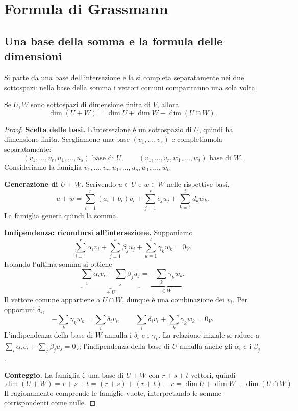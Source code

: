 
\section{Formula di Grassmann}

\subsection{Una base della somma e la formula delle dimensioni}

Si parte da una base dell'intersezione e la si completa separatamente nei due sottospazi: nella base della somma i vettori comuni compariranno una sola volta.

\begin{teorema}
Se $U,W$ sono sottospazi di dimensione finita di $V$, allora
\[
  \dim(U+W)=\dim U+\dim W-\dim(U\cap W).
\]
\end{teorema}
\begin{proof}
\textbf{Scelta delle basi.} L'intersezione è un sottospazio di $U$, quindi ha dimensione finita. Scegliamone una base $(v_1,\ldots,v_r)$ e completiamola separatamente:
\[
  (v_1,\ldots,v_r,u_1,\ldots,u_s)\text{ base di }U,
  \qquad (v_1,\ldots,v_r,w_1,\ldots,w_t)\text{ base di }W.
\]
Consideriamo la famiglia $v_1,\ldots,v_r,u_1,\ldots,u_s,w_1,\ldots,w_t$.

\textbf{Generazione di $U+W$.} Scrivendo $u\in U$ e $w\in W$ nelle rispettive basi,
\[
  u+w=\sum_{i=1}^r(a_i+b_i)v_i+\sum_{j=1}^s c_ju_j+\sum_{k=1}^t d_kw_k.
\]
La famiglia genera quindi la somma.

\textbf{Indipendenza: ricondursi all'intersezione.} Supponiamo
\[
  \sum_{i=1}^r\alpha_i v_i+\sum_{j=1}^s\beta_j u_j+\sum_{k=1}^t\gamma_k w_k=0_V.
\]
Isolando l'ultima somma si ottiene
\[
  \underbrace{\sum_i\alpha_i v_i+\sum_j\beta_j u_j}_{\in U}
  =\underbrace{-\sum_k\gamma_k w_k}_{\in W}.
\]
Il vettore comune appartiene a $U\cap W$, dunque è una combinazione dei $v_i$. Per opportuni $\delta_i$,
\[
  -\sum_k\gamma_k w_k=\sum_i\delta_i v_i,
  \qquad \sum_i\delta_i v_i+\sum_k\gamma_k w_k=0_V.
\]
L'indipendenza della base di $W$ annulla i $\delta_i$ e i $\gamma_k$. La relazione iniziale si riduce a $\sum_i\alpha_i v_i+\sum_j\beta_j u_j=0_V$; l'indipendenza della base di $U$ annulla anche gli $\alpha_i$ e i $\beta_j$.

\textbf{Conteggio.} La famiglia è una base di $U+W$ con $r+s+t$ vettori, quindi
\[
  \dim(U+W)=r+s+t=(r+s)+(r+t)-r=\dim U+\dim W-\dim(U\cap W).
\]
Il ragionamento comprende le famiglie vuote, interpretando le somme corrispondenti come nulle.
\end{proof}

